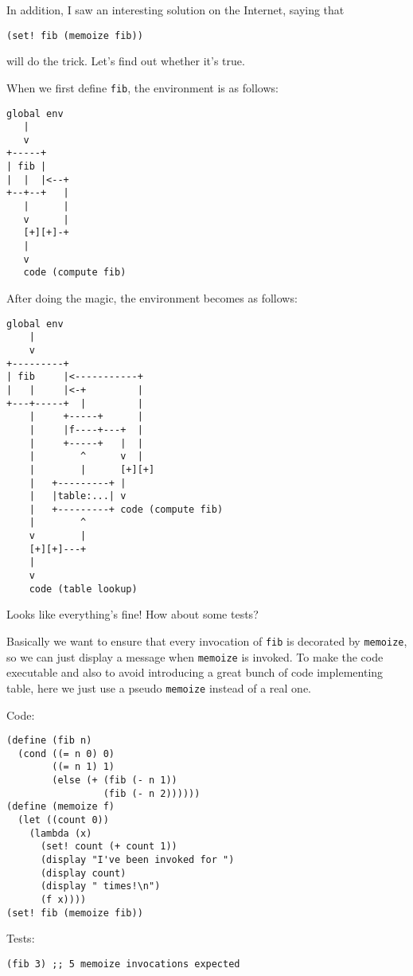 \documentclass[../main.tex]{subfiles}
\begin{document}
In addition, I saw an interesting solution on
 the Internet, saying that

\begin{lstlisting}
(set! fib (memoize fib))
\end{lstlisting}

will do the trick. Let's find out whether it's
 true.

When we first define \lstinline{fib}, the
 environment is as follows:
 
\begin{lstlisting}
global env
   |
   v
+-----+
| fib |
|  |  |<--+
+--+--+   |
   |      |
   v      |
   [+][+]-+
   |
   v
   code (compute fib)
\end{lstlisting}

After doing the magic, the environment becomes
 as follows:
 
\begin{lstlisting}
global env
    |
    v
+---------+
| fib     |<-----------+
|   |     |<-+         |
+---+-----+  |         |
    |     +-----+      |
    |     |f----+---+  |
    |     +-----+   |  |
    |        ^      v  |
    |        |      [+][+]
    |   +---------+ |
    |   |table:...| v
    |   +---------+ code (compute fib)
    |        ^
    v        |
    [+][+]---+
    |
    v
    code (table lookup)
\end{lstlisting}

Looks like everything's fine! How about some tests?

Basically we want to ensure that every invocation
 of \lstinline{fib} is decorated by
 \lstinline{memoize}, so we can just display
 a message when \lstinline{memoize} is invoked.
 To make the code executable and also to avoid
 introducing a great bunch of code implementing
 table, here we just use a pseudo
 \lstinline{memoize} instead of a real one.

Code:

\begin{lstlisting}
(define (fib n)
  (cond ((= n 0) 0)
        ((= n 1) 1)
        (else (+ (fib (- n 1))
                 (fib (- n 2))))))
(define (memoize f)
  (let ((count 0))
    (lambda (x)
      (set! count (+ count 1))
      (display "I've been invoked for ")
      (display count)
      (display " times!\n")
      (f x))))
(set! fib (memoize fib))
\end{lstlisting}

Tests:

\begin{lstlisting}
(fib 3) ;; 5 memoize invocations expected
\end{lstlisting}
\end{document}
